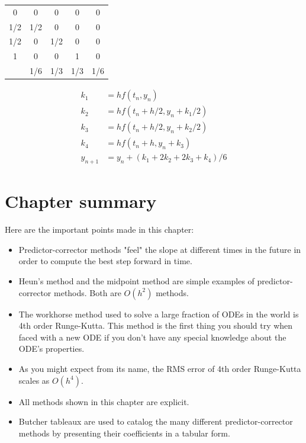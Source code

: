 \documentclass[hidelinks,notitlepage]{book}
\begin{document}
\begin{center}
\begin{minipage}{4in}
		\begin{center}
		\renewcommand{\arraystretch}{1.5}
		\begin{tabular}{  c|c c c c } 
			0 & 0 & 0 & 0 & 0 \\ 
			1/2 & 1/2 & 0 & 0 & 0 \\ 
			1/2 & 0 & 1/2 & 0 & 0 \\ 
			1 & 0 & 0 & 1 & 0 \\ 
			\hline
			& 1/6 & 1/3 & 1/3 & 1/6 \\ 
		\end{tabular}
		\end{center}
	\begin{align}
	\nonumber
	k_1 &= h f(t_n, y_n) \\
	\nonumber
	k_2 &= h f(t_n+h/2, y_n + k_1/2) \\
	\nonumber
	k_3 &= h f(t_n+h/2, y_n + k_2/2) \\
	\nonumber
	k_4 &= h f(t_n+h, y_n + k_3) \\
	\nonumber
	y_{n+1} &= y_n + (k_1 + 2 k_2 + 2 k_3 + k_4)/6
	\end{align}
\label{tab:ButcherRK4}
\end{minipage}
\end{center}



\section{Chapter summary}
Here are the important points made in this chapter:
\begin{itemize}
	\item Predictor-corrector methods "feel" the slope at different times in the future in order to compute the best step forward in time.
	\item Heun's method and the midpoint method are simple examples of predictor-corrector methods.  Both are $O(h^2)$ methods.
	\item The workhorse method used to solve a large fraction of ODEs in the world is 4th order Runge-Kutta.  This method is the first thing you should try when faced with a new ODE if you don't have any special knowledge about the ODE's properties.
	\item As you might expect from its name, the RMS error of 4th order Runge-Kutta scales as $O(h^4)$.
	\item All methods shown in this chapter are explicit.
	\item Butcher tableaux are used to catalog the many different predictor-corrector methods by presenting their coefficients in a tabular form.
\end{itemize}
\end{document}
